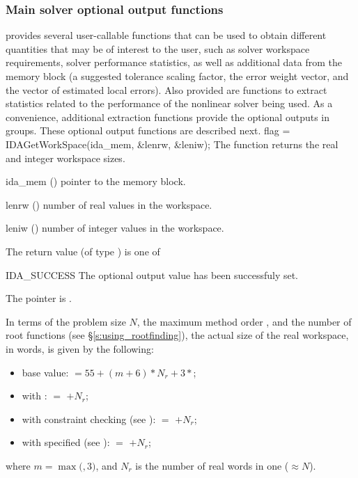 {\subsubsection{Main solver optional output functions}\label{sss:optout_main}
{\ida} provides several user-callable functions that can be used to obtain
different quantities that may be of interest to the user, such as solver workspace
requirements, solver performance statistics, as well as additional data from
the {\ida} memory block (a suggested tolerance scaling factor, the error weight
vector, and the vector of estimated local errors). Also provided are functions to
extract statistics related to the performance of the {\ida} nonlinear solver
being used. As a convenience, additional extraction functions provide the optional 
outputs in groups.
These optional output functions are described next.
{
  flag = IDAGetWorkSpace(ida\_mem, \&lenrw, \&leniw);
}
{
  The function  returns the
  {\ida} real and integer workspace sizes.
}
{
  \begin{args}
  \item[ida\_mem] ()
    pointer to the {\ida} memory block.
  \item[lenrw] ()
    number of real values in the {\ida} workspace.
  \item[leniw] ()
    number of integer values in the {\ida} workspace.
  \end{args}
}
{
  The return value  (of type ) is one of
  \begin{args}
  \item[IDA\_SUCCESS] 
    The optional output value has been successfuly set.
  \item[\Id{IDA\_MEM\_NULL}]
    The  pointer is .
  \end{args}
}
{
  In terms of the problem size $N$, the maximum method order , and
  the number  of root functions (see \S\ref{s:using_rootfinding}),
  the actual size of the real workspace, in  words, is
  given by the following:
  \begin{itemize}
  \item base value:  $= 55 + (m + 6)*N_r + 3*$;
  \item with :  $=$  $+ N_r$;
  \item with constraint checking (see ): 
     $=$  $+ N_r$;
  \item with  specified (see ): 
     $=$  $+ N_r$;
  \end{itemize}
  where $m = \max($$,3)$, and
  $N_r$ is the number of real words in one  ($\approx N$).

}}
